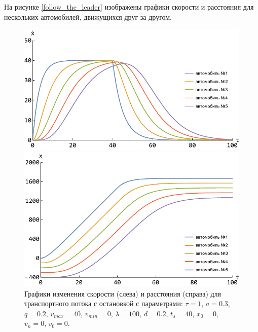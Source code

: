 \documentclass[12pt, a4paper]{extarticle}
\numberwithin{equation}{section}
\numberwithin{figure}{section}
\begin{document}
На рисунке \eqref{follow_the_leader} изображены графики скорости и расстояния для нескольких автомобилей, движущихся друг за другом.

\begin{figure}[h!]
	\begin{center}
		\begin{minipage}[h!]{0.48\linewidth}
			\includegraphics[width=1\linewidth,height=0.2\textheight]
			{Images/simple_model_speed.pdf}
		\end{minipage}
		\hfill 
		\begin{minipage}[h!]{0.48\linewidth}
			\includegraphics[width=1\linewidth,height=0.2\textheight]
			{Images/simple_model_distance.pdf}
		\end{minipage}
		\caption{Графики изменения скорости (слева) и расстояния (справа) для транспортного потока с остановкой с параметрами: $\tau=1$, $a=0.3$, $q=0.2$, $v_{max}=40$, $v_{min}=0$, $\lambda=100$, $d=0.2$, $t_s=40$, $x_0=0$, $v_n=0$, $v_0=0$.}
		\label{follow_the_leader}
	\end{center}
\end{figure}
\end{document}

